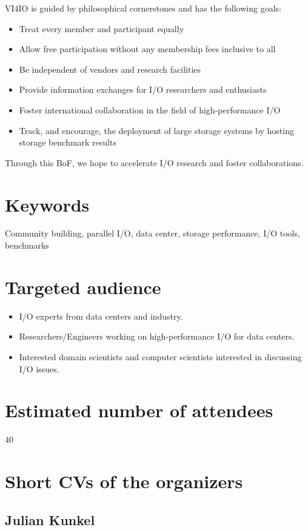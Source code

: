 \documentclass[a4paper,10pt]{article}
\begin{document}
VI4IO is guided by philosophical cornerstones and has the following goals:
\begin{itemize}
  \item Treat every member and participant equally
  \item Allow free participation without any membership fees inclusive to all
  \item Be independent of vendors and research facilities
  \item Provide information exchanges for I/O researchers and enthusiasts 
  \item Foster international collaboration in the field of high-performance I/O
  \item Track, and encourage, the deployment of large storage systems by hosting storage benchmark results 
\end{itemize}

Through this BoF, we hope to accelerate I/O research and foster collaborations.

\section{Keywords} 
Community building, parallel I/O, data center, storage performance, I/O tools, benchmarks


\section{Targeted audience}
\begin{itemize}
  \item I/O experts from data centers and industry.
  \item Researchers/Engineers working on high-performance I/O for data centers.
  \item Interested domain scientists and computer scientists interested in discussing I/O issues.
\end{itemize}


\section{Estimated number of attendees}
40

\section{Short CVs of the organizers}

\subsection{Julian Kunkel}
\end{document}
